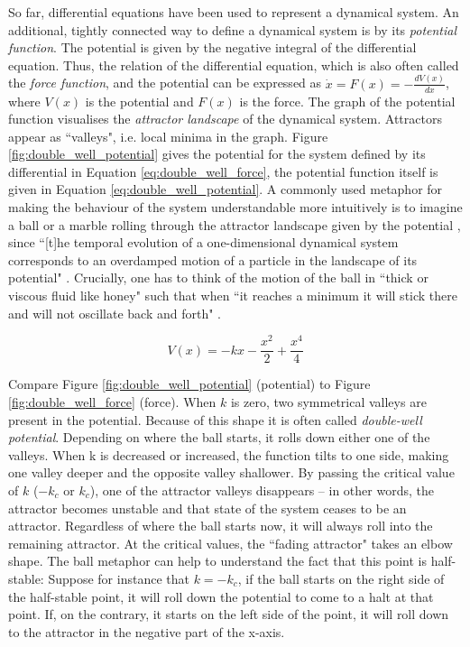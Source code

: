 So far, differential equations have been used to represent a dynamical system. An additional, tightly connected way to define a dynamical system is by its \emph{potential function}. The potential is given by the negative integral of the differential equation. Thus, the relation of the differential equation, which is also often called the \emph{force function}, and the potential can be expressed as $\dot{x} = F(x) = -\frac{dV(x)}{dx}$, where $V(x)$ is the potential and $F(x)$ is the force. The graph of the potential function visualises the \emph{attractor landscape} of the dynamical system. Attractors appear as ``valleys", i.e. local minima in the graph. Figure \ref{fig:double_well_potential} gives the potential for the system defined by its differential in Equation \ref{eq:double_well_force}, the potential function itself is given in Equation \ref{eq:double_well_potential}. A commonly used metaphor for making the behaviour of the system understandable more intuitively is to imagine a ball or a marble rolling through the attractor landscape given by the potential \citep{HakenLevi2012}, since ``[t]he temporal evolution of a one-dimensional dynamical system corresponds to an overdamped motion of a particle in the landscape of its potential" \citep[22]{Fuchs2013}. Crucially, one has to think of the motion of the ball in ``thick or viscous fluid like honey" such that when ``it reaches a minimum it will stick there and will not oscillate back and forth" \citep[22]{Fuchs2013}.

\begin{equation}
V(x) = - kx - \frac{x^2}{2} + \frac{x^4}{4}
\label{eq:double_well_potential}
\end{equation}

Compare Figure \ref{fig:double_well_potential} (potential) to Figure \ref{fig:double_well_force} (force). When $k$ is zero, two symmetrical valleys are present in the potential. Because of this shape it is often called \emph{double-well potential}. Depending on where the ball starts, it rolls down either one of the valleys. When k is decreased or increased, the function tilts to one side, making one valley deeper and the opposite valley shallower. By passing the critical value of $k$ ($-k_c$ or $k_c$), one of the attractor valleys disappears -- in other words, the attractor becomes unstable and that state of the system ceases to be an attractor. Regardless of where the ball starts now, it will always roll into the remaining attractor. At the critical values, the ``fading attractor" takes an elbow shape. The ball metaphor can help to understand the fact that this point is half-stable: Suppose for instance that $k = -k_c$, if the ball starts on the right side of the half-stable point, it will roll down the potential to come to a halt at that point. If, on the contrary, it starts on the left side of the point, it will roll down to the attractor in the negative part of the x-axis. 

